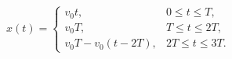 \documentclass[border=2.5pt]{standalone}
\begin{document}
$\displaystyle x(t)=\begin{cases} v_0t,&0\le t\le T,\\ v_0T,&T\le t\le2T,\\ v_0T-v_0(t-2T),&2T\le t\le3T. \end{cases}$
\end{document}
